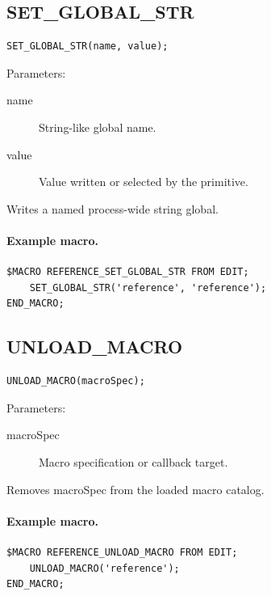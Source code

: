 \documentclass[a4paper,10pt,twoside,openany]{book}
\newenvironment{mrmacextension}{\begin{changebar}}{\end{changebar}}
\begin{document}
\begin{mrmacextension}
\label{prim:procedure-set-global-str}
\subsection*{SET\_GLOBAL\_STR}
\begin{verbatim}
SET_GLOBAL_STR(name, value);
\end{verbatim}
Parameters:
\begin{description}
\item[name] String-like global name.
\item[value] Value written or selected by the primitive.
\end{description}

Writes a named process-wide string global.

\paragraph{Example macro.}
\begin{verbatim}
$MACRO REFERENCE_SET_GLOBAL_STR FROM EDIT;
    SET_GLOBAL_STR('reference', 'reference');
END_MACRO;
\end{verbatim}
\end{mrmacextension}

\label{prim:procedure-unload-macro}
\subsection*{UNLOAD\_MACRO}
\begin{verbatim}
UNLOAD_MACRO(macroSpec);
\end{verbatim}
Parameters:
\begin{description}
\item[macroSpec] Macro specification or callback target.
\end{description}

Removes macroSpec from the loaded macro catalog.

\paragraph{Example macro.}
\begin{verbatim}
$MACRO REFERENCE_UNLOAD_MACRO FROM EDIT;
    UNLOAD_MACRO('reference');
END_MACRO;
\end{verbatim}
\end{document}
